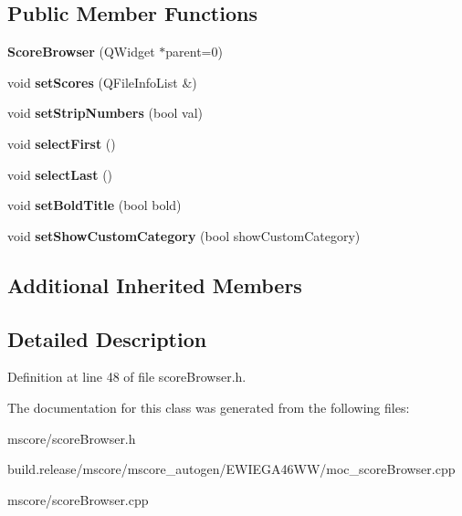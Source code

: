 \subsection*{Public Member Functions}
\begin{DoxyCompactItemize}
\item 
\mbox{\label{class_ms_1_1_score_browser_ad204fb7f6e0cc68e7e36e7c3d401bba7}} 
{\bfseries Score\+Browser} (Q\+Widget $\ast$parent=0)
\item 
\mbox{\label{class_ms_1_1_score_browser_a26bc529dddf88be5ffd7faae104f2699}} 
void {\bfseries set\+Scores} (Q\+File\+Info\+List \&)
\item 
\mbox{\label{class_ms_1_1_score_browser_a63d904a8149b005965905a0d066f7d53}} 
void {\bfseries set\+Strip\+Numbers} (bool val)
\item 
\mbox{\label{class_ms_1_1_score_browser_a736890f3ba3c51204b78ff4c9c2e914f}} 
void {\bfseries select\+First} ()
\item 
\mbox{\label{class_ms_1_1_score_browser_a933cc0430e939d697adb00094c9176e6}} 
void {\bfseries select\+Last} ()
\item 
\mbox{\label{class_ms_1_1_score_browser_a066300db7896a2851d1a2960107b98ed}} 
void {\bfseries set\+Bold\+Title} (bool bold)
\item 
\mbox{\label{class_ms_1_1_score_browser_a9b0ce378b03c6a0f6efea25b8106da8d}} 
void {\bfseries set\+Show\+Custom\+Category} (bool show\+Custom\+Category)
\end{DoxyCompactItemize}
\subsection*{Additional Inherited Members}


\subsection{Detailed Description}


Definition at line 48 of file score\+Browser.\+h.



The documentation for this class was generated from the following files\+:\begin{DoxyCompactItemize}
\item 
mscore/score\+Browser.\+h\item 
build.\+release/mscore/mscore\+\_\+autogen/\+E\+W\+I\+E\+G\+A46\+W\+W/moc\+\_\+score\+Browser.\+cpp\item 
mscore/score\+Browser.\+cpp\end{DoxyCompactItemize}
